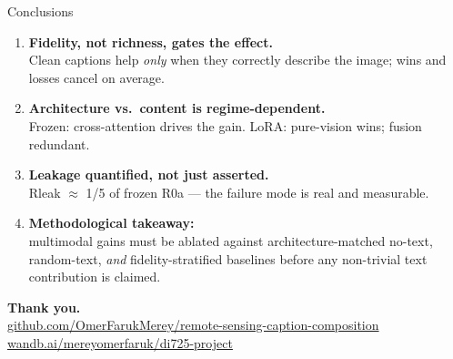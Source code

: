 \documentclass[aspectratio=169,11pt]{beamer}
\begin{document}
\begin{frame}{Conclusions}
\begin{enumerate}\setlength\itemsep{6pt}
\item \textbf{Fidelity, not richness, gates the effect.}\\
  {\small Clean captions help \emph{only} when they correctly describe the image;
   wins and losses cancel on average.}

\item \textbf{Architecture vs.\ content is regime-dependent.}\\
  {\small Frozen: cross-attention drives the gain.
   LoRA: pure-vision wins; fusion redundant.}

\item \textbf{Leakage quantified, not just asserted.}\\
  {\small Rleak $\approx$ 1/5 of frozen R0a --- the failure mode is real and measurable.}

\item \textbf{Methodological takeaway:}\\
  {\small multimodal gains must be ablated against
   architecture-matched no-text, random-text, \emph{and}
   fidelity-stratified baselines before any non-trivial text
   contribution is claimed.}
\end{enumerate}

\vfill
\centering
\large \textbf{Thank you.}\\[4pt]
{\footnotesize\href{https://github.com/OmerFarukMerey/remote-sensing-caption-composition}{github.com/OmerFarukMerey/remote-sensing-caption-composition}}\\
{\footnotesize\href{https://wandb.ai/mereyomerfaruk/di725-project}{wandb.ai/mereyomerfaruk/di725-project}}
\end{frame}
\end{document}

